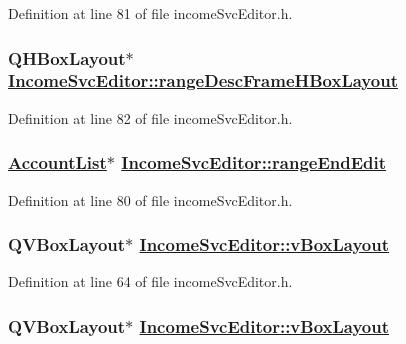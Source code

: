 Definition at line 81 of file income\-Svc\-Editor.h.\hypertarget{classIncomeSvcEditor_r25}{
\subsubsection[rangeDescFrameHBoxLayout]{\setlength{\rightskip}{0pt plus 5cm}QHBox\-Layout$\ast$ \hyperlink{classIncomeSvcEditor_r25}{Income\-Svc\-Editor::range\-Desc\-Frame\-HBox\-Layout}}}
\label{classIncomeSvcEditor_r25}


Definition at line 82 of file income\-Svc\-Editor.h.\hypertarget{classIncomeSvcEditor_r23}{
\subsubsection[rangeEndEdit]{\setlength{\rightskip}{0pt plus 5cm}\hyperlink{classAccountList}{Account\-List}$\ast$ \hyperlink{classIncomeSvcEditor_r23}{Income\-Svc\-Editor::range\-End\-Edit}}}
\label{classIncomeSvcEditor_r23}


Definition at line 80 of file income\-Svc\-Editor.h.\hypertarget{classIncomeSvcEditor_r7}{
\subsubsection[vBoxLayout]{\setlength{\rightskip}{0pt plus 5cm}QVBox\-Layout$\ast$ \hyperlink{classIncomeSvcEditor_r3}{Income\-Svc\-Editor::v\-Box\-Layout}}}
\label{classIncomeSvcEditor_r7}


Definition at line 64 of file income\-Svc\-Editor.h.\hypertarget{classIncomeSvcEditor_r3}{
\subsubsection[vBoxLayout]{\setlength{\rightskip}{0pt plus 5cm}QVBox\-Layout$\ast$ \hyperlink{classIncomeSvcEditor_r3}{Income\-Svc\-Editor::v\-Box\-Layout}}}
\label{classIncomeSvcEditor_r3}


